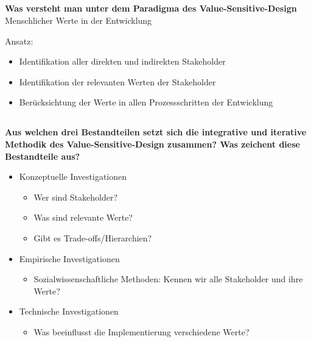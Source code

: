 \subsection{}
\textbf{Was versteht man unter dem Paradigma des Value-Sensitive-Design}
Menschlicher Werte in der Entwicklung

Ansatz:
\begin{itemize}
    \item Identifikation aller direkten und indirekten Stakeholder
    \item Identifikation der relevanten Werten der Stakeholder
    \item Berücksichtung der Werte in allen Prozessschritten der Entwicklung
\end{itemize}
\subsection{}
\textbf{Aus welchen drei Bestandteilen setzt sich die integrative und iterative Methodik des Value-Sensitive-Design zusammen? Was zeichent diese Bestandteile aus?}
\begin{itemize}
    \item Konzeptuelle Investigationen\begin{itemize}
              \item Wer sind Stakeholder?
              \item Was sind relevante Werte?
              \item Gibt es Trade-offs/Hierarchien?
          \end{itemize}
    \item Empirische Investigationen\begin{itemize}
              \item Sozialwissenschaftliche Methoden: Kennen wir alle Stakeholder und ihre Werte?
          \end{itemize}
    \item Technische Investigationen\begin{itemize}
              \item Was beeinflusst die Implementierung verschiedene Werte?
          \end{itemize}
\end{itemize}